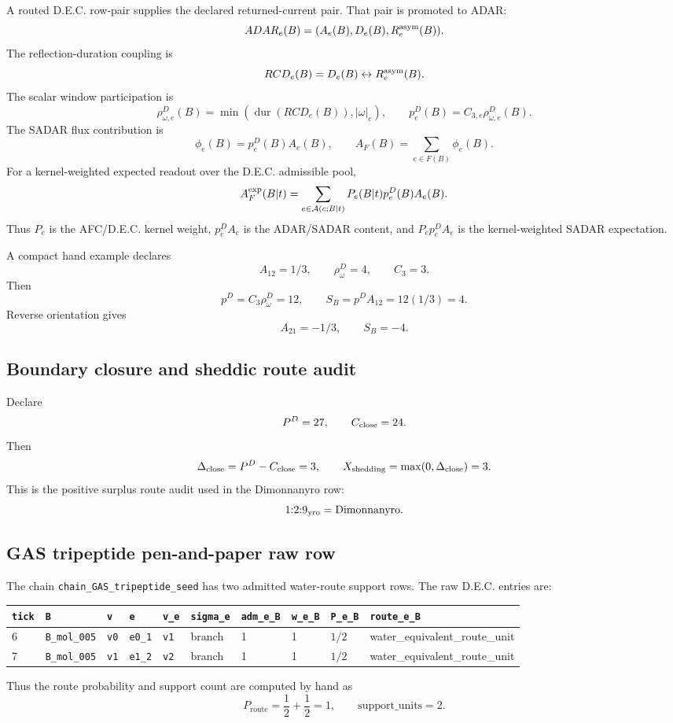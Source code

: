 A routed D.E.C. row-pair supplies the declared returned-current pair. That pair is promoted to ADAR:
\[
ADAR_e(B)=(A_e(B),D_e(B),R^{\rm asym}_e(B)).
\]
The reflection-duration coupling is
\[
RCD_e(B)=D_e(B)\leftrightarrow R^{\rm asym}_e(B).
\]
The scalar window participation is
\[
\rho^D_{\omega,e}(B)=\min(\operatorname{dur}(RCD_e(B)),|\omega|_e),
\qquad
p^D_e(B)=C_{3,e}\rho^D_{\omega,e}(B).
\]
The SADAR flux contribution is
\[
\phi_e(B)=p^D_e(B)A_e(B),
\qquad
A_F(B)=\sum_{e\in F(B)}\phi_e(B).
\]
For a kernel-weighted expected readout over the D.E.C. admissible pool,
\[
A_F^{\rm exp}(B|t)=\sum_{e\in\mathcal A(c;B|t)}P_e(B|t)p^D_e(B)A_e(B).
\]
Thus $P_e$ is the AFC/D.E.C. kernel weight, $p^D_eA_e$ is the ADAR/SADAR content, and $P_ep^D_eA_e$ is the kernel-weighted SADAR expectation.

A compact hand example declares
\[
A_{12}=1/3,
\qquad
\rho^D_{\omega}=4,
\qquad
C_3=3.
\]
Then
\[
p^D=C_3\rho^D_{\omega}=12,
\qquad
S_B=p^D A_{12}=12(1/3)=4.
\]
Reverse orientation gives
\[
A_{21}=-1/3,
\qquad
S_B=-4.
\]

\subsection{Boundary closure and sheddic route audit}

Declare
\[
P^D=27,
\qquad
C_{\rm close}=24.
\]
Then
\[
\Delta_{\rm close}=P^D-C_{\rm close}=3,
\qquad
X_{\rm shedding}=\max(0,\Delta_{\rm close})=3.
\]
This is the positive surplus route audit used in the Dimonnanyro row:
\[
1{:}2{:}9_{\rm yro}=\text{Dimonnanyro}.
\]

\subsection{GAS tripeptide pen-and-paper raw row}

The chain \texttt{chain\_GAS\_tripeptide\_seed} has two admitted water-route support rows. The raw D.E.C. entries are:
\begin{center}
\scriptsize
\begin{tabularx}{0.98\linewidth}{@{}llllllllll@{}}
\toprule
\texttt{tick} & \texttt{B} & \texttt{v} & \texttt{e} & \texttt{v\_e} & \texttt{sigma\_e} & \texttt{adm\_e\_B} & \texttt{w\_e\_B} & \texttt{P\_e\_B} & \texttt{route\_e\_B} \\
\midrule
6 & \texttt{B\_mol\_005} & \texttt{v0} & \texttt{e0\_1} & \texttt{v1} & branch & 1 & 1 & $1/2$ & water\_equivalent\_route\_unit \\
7 & \texttt{B\_mol\_005} & \texttt{v1} & \texttt{e1\_2} & \texttt{v2} & branch & 1 & 1 & $1/2$ & water\_equivalent\_route\_unit \\
\bottomrule
\end{tabularx}
\end{center}
Thus the route probability and support count are computed by hand as
\[
P_{\mathrm{route}}=\frac12+\frac12=1,
\qquad
\mathrm{support\_units}=2.
\]


